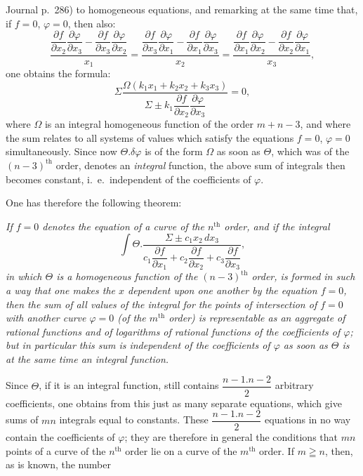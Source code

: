 \documentclass{article}
\begin{document}
Journal p.\ 286) to homogeneous equations, and remarking at the same time that, if $f = 0$, $\varphi = 0$, then also:
\[ \frac{\dfrac{\partial f}{\partial x_{2}}\dfrac{\partial \varphi}{\partial x_{3}} - \dfrac{\partial f}{\partial x_{3}}\dfrac{\partial \varphi}{\partial x_{2}}}{x_{1}} = \frac{\dfrac{\partial f}{\partial x_{3}}\dfrac{\partial \varphi}{\partial x_{1}} - \dfrac{\partial f}{\partial x_{1}}\dfrac{\partial \varphi}{\partial x_{3}}}{x_{2}} = \frac{\dfrac{\partial f}{\partial x_{1}}\dfrac{\partial \varphi}{\partial x_{2}} - \dfrac{\partial f}{\partial x_{2}}\dfrac{\partial \varphi}{\partial x_{1}}}{x_{3}}, \]
one obtains the formula:
\[ \Sigma\frac{\Omega(k_{1}x_{1} + k_{2}x_{2} + k_{3}x_{3})}{\Sigma\pm k_{1}\dfrac{\partial f}{\partial x_{2}}\dfrac{\partial \varphi}{\partial x_{3}}} = 0, \]
where $\Omega$ is an integral homogeneous function of the order $m+n-3$, and where the sum relates to all systems of values which satisfy the equations $f = 0$, $\varphi = 0$ simultaneously. Since now $\Theta.\delta\varphi$ is of the form $\Omega$ as soon as $\Theta$, which was of the $(n-3)^{\text{th}}$ order, denotes an \emph{integral} function, the above sum of integrals then becomes constant, i.\ e.\ independent of the coefficients of $\varphi$.

One has therefore the following theorem:

\emph{If $f = 0$ denotes the equation of a curve of the $n^{\text{th}}$ order, and if the integral}
\[ \int \Theta.\frac{\Sigma\pm c_{1}x_{2}\,dx_{3}}{c_{1}\dfrac{\partial f}{\partial x_{1}} + c_{2}\dfrac{\partial f}{\partial x_{2}} + c_{3}\dfrac{\partial f}{\partial x_{3}}}, \]
\emph{in which $\Theta$ is a homogeneous function of the $(n-3)^{\text{th}}$ order, is formed in such a way that one makes the $x$ dependent upon one another by the equation $f = 0$, then the sum of all values of the integral for the points of intersection of $f = 0$ with another curve $\varphi = 0$ (of the $m^{\text{th}}$ order) is representable as an aggregate of rational functions and of logarithms of rational functions of the coefficients of $\varphi$; but in particular this sum is independent of the coefficients of $\varphi$ as soon as $\Theta$ is at the same time an integral function.}

Since $\Theta$, if it is an integral function, still contains $\dfrac{n-1.n-2}{2}$ arbitrary coefficients, one obtains from this just as many separate equations, which give sums of $mn$ integrals equal to constants. These $\dfrac{n-1.n-2}{2}$ equations in no way contain the coefficients of $\varphi$; they are therefore in general the conditions that $mn$ points of a curve of the $n^{\text{th}}$ order lie on a curve of the $m^{\text{th}}$ order. If $m \geqq n$, then, as is known, the number
\end{document}
